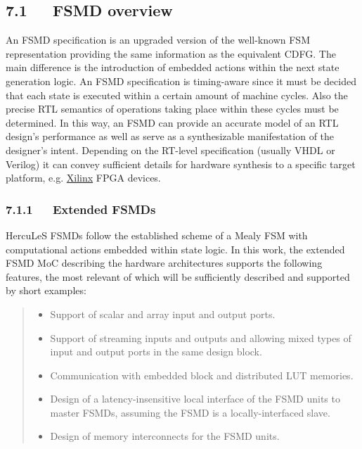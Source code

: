 \documentclass[a4paper]{article}
\begin{document}
\subsection{7.1~~~FSMD overview%
  \label{fsmd-overview}%
}

An FSMD specification is an upgraded version of the well-known FSM
representation providing the same information as the equivalent CDFG. The main
difference is the introduction of embedded actions within the next state
generation logic. An FSMD specification is timing-aware since it must be decided
that each state is executed within a certain amount of machine cycles. Also the
precise RTL semantics of operations taking place within these cycles must be
determined. In this way, an FSMD can provide an accurate model of an RTL
design's performance as well as serve as a synthesizable manifestation of the
designer's intent. Depending on the RT-level specification (usually VHDL or
Verilog) it can convey sufficient details for hardware synthesis to a specific
target platform, e.g. \href{http://www.xilinx.com}{Xilinx} FPGA devices.


\subsubsection{7.1.1~~~Extended FSMDs%
  \label{extended-fsmds}%
}

HercuLeS FSMDs follow the established scheme of a Mealy FSM with computational
actions embedded within state logic. In this work, the extended FSMD MoC
describing the hardware architectures supports the following features, the most
relevant of which will be sufficiently described and supported by short
examples:
%
\begin{quote}
%
\begin{itemize}

\item Support of scalar and array input and output ports.

\item Support of streaming inputs and outputs and allowing mixed types of input
and output ports in the same design block.

\item Communication with embedded block and distributed LUT memories.

\item Design of a latency-insensitive local interface of the FSMD units to master
FSMDs, assuming the FSMD is a locally-interfaced slave.

\item Design of memory interconnects for the FSMD units.

\end{itemize}

\end{quote}
\end{document}
